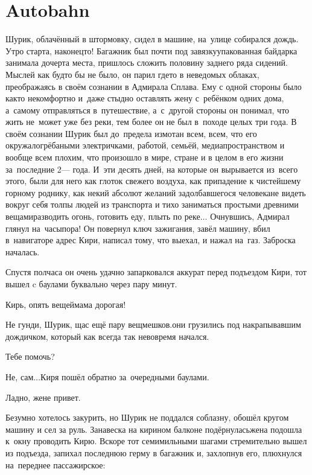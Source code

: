 \chapter{Autobahn}
\vepsianrose

Шурик, облачённый в штормовку, сидел в машине, на~улице собирался дождь. Утро старта, наконец\sdash то! Багажник был почти под завязку\mdash упакованная байдарка занимала дочерта места, пришлось сложить половину заднего ряда сидений. Мыслей как будто бы не было, он парил где\sdash то в неведомых облаках, преображаясь в своём сознании в Адмирала Сплава. Ему с одной стороны было как\sdash то некомфортно и~даже стыдно оставлять жену с~ребёнком одних дома, а~самому отправляться в~путешествие, а~с~другой стороны он понимал, что жить не~может уже без реки, тем более он не был в~походе целых три года. В своём сознании Шурик был до~предела измотан всем, всем, что его окружало\mdash грёбаными электричками, работой, семьёй, медиапространством и вообще всем плохим, что произошло в мире, стране и в целом в его жизни за~последние 2\thinspace\nobreakdash--- года. И~эти десять дней, на которые он вырывается из~всего этого, были для него как глоток свежего воздуха, как припадение к чистейшему горному роднику, как некий абсолют желаний задолбавшегося человека\mdash не видеть вокруг себя толпы людей из транспорта и тихо заниматься простыми древними вещами\mdash разводить огонь, готовить еду, плыть по реке$\ldots$ Очнувшись, Адмирал глянул на~часы\mdash пора! Он повернул ключ зажигания, завёл машину, вбил в~навигаторе адрес Кири, написал тому, что выехал, и нажал на~газ. Заброска началась.

Спустя полчаса он очень удачно запарковался аккурат перед подъездом Кири, тот вышел c баулами буквально через пару минут.

\diagdash Кирь, опять вещей\mdash мама дорогая!

\diagdash Не гунди, Шурик, щас ещё пару вещмешков.\mdash они грузились под накрапывавшим дождичком, который как всегда так невовремя начался.

\diagdash Тебе помочь?

\diagdash Не, сам$\ldots$\mdash Киря пошёл обратно за~очередными баулами.

\diagdash Ладно, жене привет.

Безумно хотелось закурить, но Шурик не поддался соблазну, обошёл кругом машину и сел за руль. Занавеска на кирином балконе подёрнулась\mdash жена подошла к~окну проводить Кирю. Вскоре тот семимильными шагами стремительно вышел из подъезда, запихал последнюю герму в багажник и, захлопнув его, плюхнулся на~переднее пассажирское:

